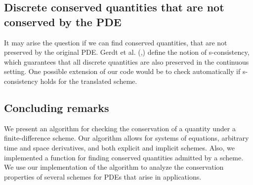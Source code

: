 \documentclass[sigconf,twocolumn]{acmart}
\newcommand{\1}{{\chi}}
\numberwithin{equation}{section}
\theoremstyle{thmlemcorr}
\numberwithin{theorem}{section}
\theoremstyle{thmlemcorr*}
\theoremstyle{defi}
\theoremstyle{remexample}
\theoremstyle{ass}
\begin{document}
\subsection*{Discrete conserved quantities that are not conserved by the PDE}
It may arise the question if we can find conserved quantities, that are not preserved by the original PDE. Gerdt et al. (\cite{gerdt10},\cite{gerdt12}) define the notion of s-consistency, which guarantees that all discrete quantities are also preserved in the continuous setting. One possible extension of our code would be to check automatically if s-consistency holds for the translated scheme.
\subsection*{Concluding remarks}
We present an algorithm for checking the conservation of a quantity under a finite-difference scheme. Our algorithm allows for systems of equations, arbitrary time and space derivatives, and both explicit and implicit schemes. Also, we implemented a function for finding conserved quantities admitted by a scheme. We use our implementation of the algorithm to analyze the conservation properties of several schemes for PDEs that arise in applications.



\end{document}
